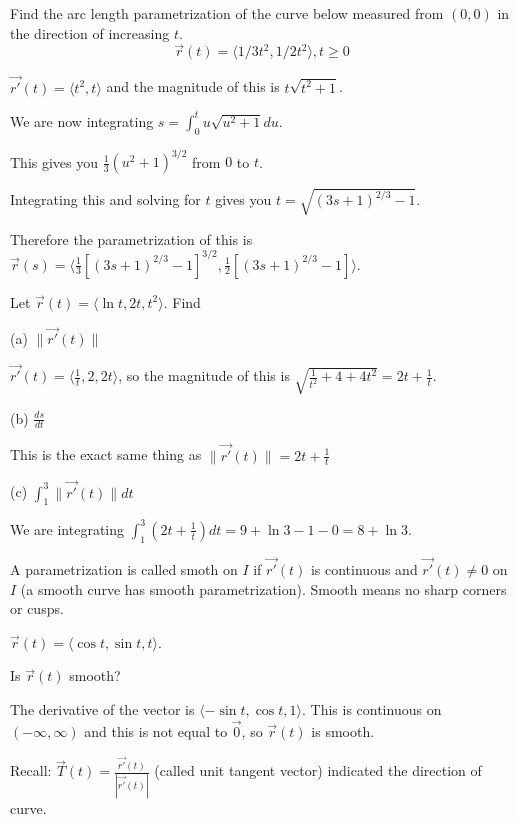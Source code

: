 \documentclass[../calc3.tex]{subfiles}
\begin{document}
\begin{example}
    Find the arc length parametrization of the curve below measured from $(0,0)$ in the direction of increasing $t$.
    \[ \vec{r}(t)=\langle 1/3t^2, 1/2t^2\rangle, t\geq 0 \]

    $\vec{r'}(t)=\langle t^2,t\rangle$ and the magnitude of this is $t\sqrt{t^2+1}$.

    We are now integrating $s=\int_0^t u\sqrt{u^2+1}du$.

    This gives you $\frac{1}{3}(u^2+1)^{3/2}$ from $0$ to $t$.

    Integrating this and solving for $t$ gives you $t=\sqrt{(3s+1)^{2/3}-1}$.

    Therefore the parametrization of this is $\vec{r}(s)=\langle \frac{1}{3}[(3s+1)^{2/3}-1]^{3/2}, \frac{1}{2}[(3s+1)^{2/3}-1]\rangle$.
\end{example}

\begin{example}
    Let $\vec{r}(t)=\langle \ln t, 2t, t^2\rangle$. Find 

    (a) $\| \vec{r'}(t) \|$

    $\vec{r'}(t)=\langle \frac{1}{t},2,2t\rangle$, so the magnitude of this is $\sqrt{\frac{1}{t^2}+4+4t^2}=2t+\frac{1}{t}$.

    (b) $\frac{ds}{dt}$

    This is the exact same thing as $\| \vec{r'}(t)\| = 2t+\frac{1}{t}$

    (c) $\int_1^3 \| \vec{r'}(t)\| dt$

    We are integrating $\int_1^3 (2t+\frac{1}{t})dt = 9+\ln 3-1-0 = 8+\ln 3$.
\end{example}

A parametrization is called smoth on $I$ if $\vec{r'}(t)$ is continuous and $\vec{r'}(t)\neq 0$ on $I$ (a smooth curve has smooth parametrization). Smooth means no sharp corners or cusps.

\pagebreak
\begin{example}
    $\vec{r}(t)=\langle \cos t, \sin t, t\rangle$.
    
    Is $\vec{r}(t)$ smooth?

    The derivative of the vector is $\langle -\sin t,\cos t, 1\rangle$. This is continuous on $(-\infty,\infty)$ and this is not equal to $\vec{0}$, so $\vec{r}(t)$ is smooth.
\end{example}

Recall: $\vec{T}(t)=\frac{\vec{r'}(t)}{|\vec{r'}(t)|}$ (called unit tangent vector) indicated the direction of curve.
\end{document}
